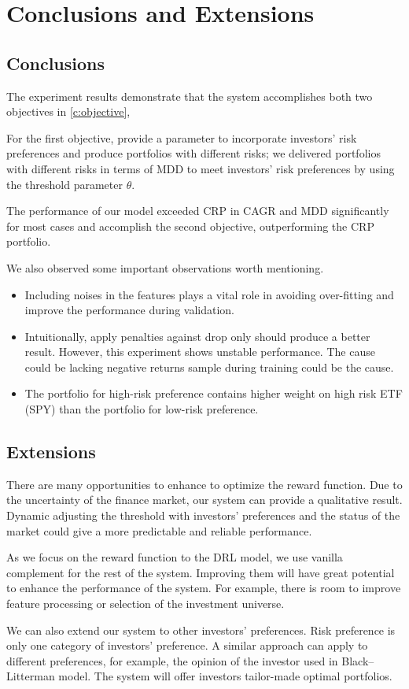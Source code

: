 \chapter{Conclusions and Extensions}
\label{c:conclusion}
\section{Conclusions}
The experiment results demonstrate that the system accomplishes both two objectives in \autoref{c:objective},
\par
For the first objective, provide a parameter to incorporate investors' risk preferences and produce portfolios with different risks; we delivered portfolios with different risks in terms of MDD to meet investors' risk preferences by using the threshold parameter $\theta$.
\par
The performance of our model exceeded CRP in CAGR and MDD significantly for most cases and accomplish the second objective, outperforming the CRP portfolio.
\par
We also observed some important observations worth mentioning.
\begin{itemize}
    \item Including noises in the features plays a vital role in avoiding over-fitting and improve the performance during validation. 
    \item Intuitionally, apply penalties against drop only should produce a better result. However, this experiment shows unstable performance. The cause could be lacking negative returns sample during training could be the cause.
    \item The portfolio for high-risk preference contains higher weight on high risk ETF (SPY) than the portfolio for low-risk preference.
\end{itemize}

\section{Extensions}
There are many opportunities to enhance to optimize the reward function. Due to the uncertainty of the finance market, our system can provide a qualitative result. Dynamic adjusting the threshold with investors' preferences and the status of the market could give a more predictable and reliable performance.

As we focus on the reward function to the DRL model, we use vanilla complement for the rest of the system. Improving them will have great potential to enhance the performance of the system. For example, there is room to improve feature processing or selection of the investment universe.

\par
We can also extend our system to other investors' preferences. Risk preference is only one category of investors' preference. A similar approach can apply to different preferences, for example, the opinion of the investor used in Black–Litterman model\cite{black1992global}. The system will offer investors tailor-made optimal portfolios.